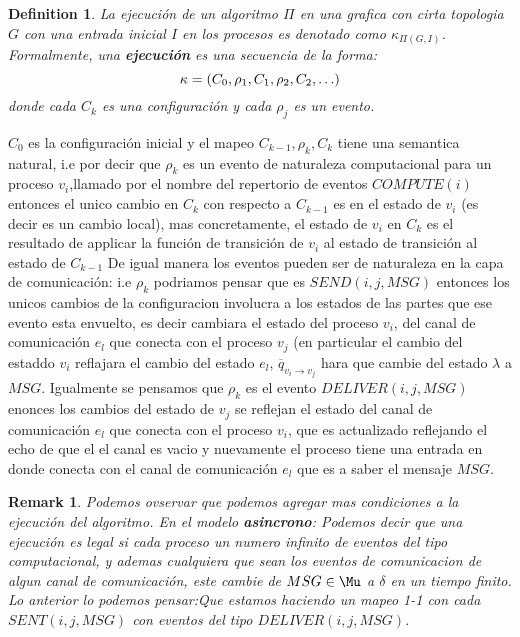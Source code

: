 \documentclass[10pt]{report}
\newtheorem*{remark}{Remark}
\newtheorem{definition}{Definition}
\begin{document}
    \theoremstyle{definition}
    \begin{definition}
        La ejecución de un algoritmo $\Pi$ en una grafica con cirta topologia
        $G$ con una entrada inicial $I$ en los procesos es denotado como $\kappa_{\Pi(G,I)}$.
        Formalmente, una \textbf{ejecución} es una secuencia de la forma:
        \begin{equation}
            \kappa = (C_{0},\rho_{1},C_{1},\rho_{2},C_{2},\mathellipsis)
        \end{equation}
        donde cada $C_{k}$ es una configuración y cada $\rho_{j}$ es un evento.
    \end{definition}
    $C_{0}$ es la configuración inicial y el mapeo $C_{k-1}, \rho_{k},C_{k}$ tiene una semantica natural,
    i.e por decir que $\rho_{k}$ es un evento de naturaleza computacional para un proceso $v_{i}$,llamado por
    el nombre del repertorio de eventos $COMPUTE(i)$ entonces el unico cambio en $C_{k}$ con respecto a $C_{k-1}$
    es en el estado de $v_{i}$ (es decir es un cambio local), mas concretamente, el estado de $v_{i}$ en $C_{k}$
    es el resultado de applicar la función de transición de $v_{i}$ al estado de transición al estado de $C_{k-1}$
    De igual manera los eventos pueden ser de naturaleza en la capa de comunicación:
    i.e $\rho_{k}$ podriamos pensar que es $SEND(i,j,MSG)$ entonces los unicos cambios de la
    configuracion involucra a los estados de las partes que ese evento esta envuelto, es decir
    cambiara el estado del proceso $v_{i}$, del canal de comunicación $e_{l}$ que conecta con el proceso $v_{j}$
    (en particular el cambio del estaddo $v_{i}$ reflajara el cambio del estado $e_{l}$, $\overline{q}_{v_{i}\rightarrow v_{j}}$
    hara que cambie del estado $\lambda$ a $MSG$.
    Igualmente se pensamos que $\rho_{k}$ es el evento $DELIVER(i,j,MSG)$ enonces los cambios del estado de $v_{j}$ se
    reflejan el estado del canal de comunicación $e_{l}$ que conecta con el proceso $v_{i}$, que es actualizado reflejando
    el echo de que el el canal es vacio y nuevamente el proceso tiene una entrada en donde conecta con el canal de
    comunicación $e_{l}$ que es a saber el mensaje $MSG$.

    \begin{remark}
        Podemos ovservar que podemos agregar mas condiciones a la ejecución
        del algoritmo.
        En el modelo \textbf{asincrono}: Podemos decir que una ejecución es legal si cada
        proceso un numero infinito de eventos del tipo computacional,
        y ademas cualquiera que sean los eventos de comunicacion de algun canal de comunicación,
        este cambie de $MSG\in\Mu$ a $\delta$ en un tiempo finito.
        Lo anterior lo podemos pensar:Que estamos haciendo un mapeo 1-1 con cada $SENT(i,j,MSG)$
        con eventos del tipo $DELIVER(i,j,MSG)$.
    \end{remark}
\end{document}
